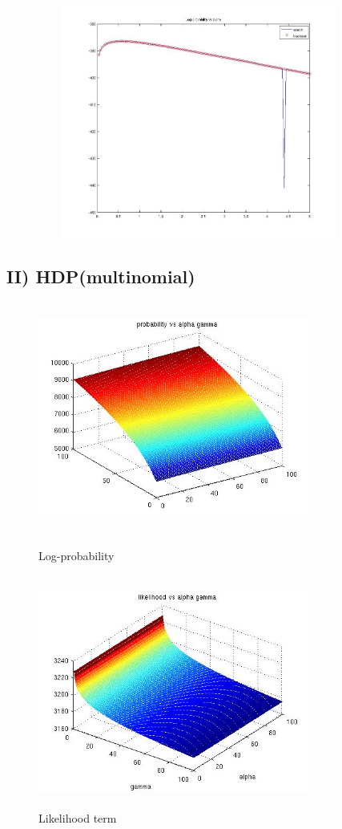 \documentclass{article}
\begin{document}
\begin{spacing}{1.1}
\begin{center}
\includegraphics[width=5in,height=3in]{prob_alpha.jpg} \\
\end{center}


\subsection{II) HDP(multinomial)}


\begin{figure}[h] 
  \begin{minipage}[b]{0.5\textwidth} 
    \centering 
    \includegraphics[width=3.5in,height=3in]{hyper.jpg} 
    \caption{Log-probability} 
    \label{fig:by:table} 
  \end{minipage}%
  \begin{minipage}[b]{0.5\textwidth} 
    \centering 
    \includegraphics[width=3.5in,height=3in]{hyper2.jpg} 
    \caption{Likelihood term} 
    \label{fig:by:table}  
   \end{minipage}%
\end{figure}


\end{spacing}
\end{document}
